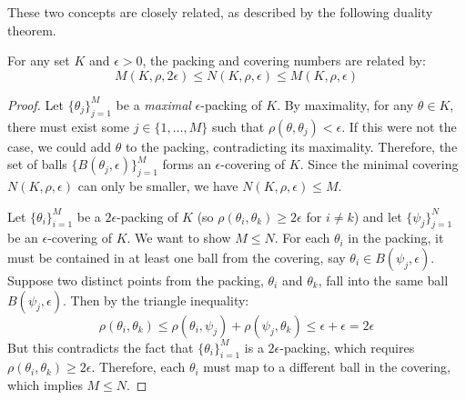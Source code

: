 These two concepts are closely related, as described by the following duality theorem.
\begin{thm}[Duality]
For any set $K$ and $\epsilon > 0$, the packing and covering numbers are related by:
$$ M(K, \rho, 2\epsilon) \le N(K, \rho, \epsilon) \le M(K, \rho, \epsilon) $$
\end{thm}
\begin{proof}
    Let $\{\theta_j\}_{j=1}^M$ be a \textit{maximal} $\epsilon$-packing of $K$. By maximality, for any $\theta \in K$, there must exist some $j \in \{1, \dots, M\}$ such that $\rho(\theta, \theta_j) < \epsilon$. If this were not the case, we could add $\theta$ to the packing, contradicting its maximality. Therefore, the set of balls $\{B(\theta_j, \epsilon)\}_{j=1}^M$ forms an $\epsilon$-covering of $K$. Since the minimal covering $N(K, \rho, \epsilon)$ can only be smaller, we have $N(K, \rho, \epsilon) \le M$.

    Let $\{\theta_i\}_{i=1}^M$ be a $2\epsilon$-packing of $K$ (so $\rho(\theta_i, \theta_k) \ge 2\epsilon$ for $i \ne k$) and let $\{\psi_j\}_{j=1}^N$ be an $\epsilon$-covering of $K$. We want to show $M \le N$.
    For each $\theta_i$ in the packing, it must be contained in at least one ball from the covering, say $\theta_i \in B(\psi_j, \epsilon)$.
    Suppose two distinct points from the packing, $\theta_i$ and $\theta_k$, fall into the same ball $B(\psi_j, \epsilon)$. Then by the triangle inequality:
    $$ \rho(\theta_i, \theta_k) \le \rho(\theta_i, \psi_j) + \rho(\psi_j, \theta_k) \le \epsilon + \epsilon = 2\epsilon $$
    But this contradicts the fact that $\{\theta_i\}_{i=1}^M$ is a $2\epsilon$-packing, which requires $\rho(\theta_i, \theta_k) \ge 2\epsilon$. Therefore, each $\theta_i$ must map to a different ball in the covering, which implies $M \le N$.

\end{proof}

